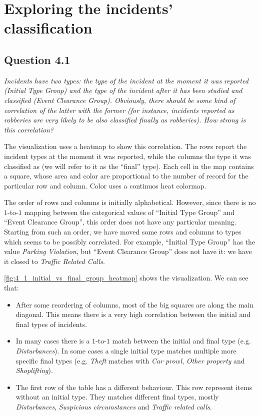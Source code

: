 \section{Exploring the incidents' classification}

\subsection*{Question 4.1}
\textit{Incidents have two types: the type of the incident at the moment it was reported (Initial Type Group) and the type of the incident after it has been studied and classified (Event Clearance Group). Obviously, there should be some kind of correlation of the latter with the former (for instance, incidents reported as robberies are very likely to be also classified finally as robberies). How strong is this correlation?}

The visualization uses a heatmap to show this correlation.
The rows report the incident types at the moment it was reported, while the columns the type it was classified as (we will refer to it as the ``final'' type).
Each cell in the map contains a square, whose area and color are proportional to the number of record for the particular row and column.
Color uses a continuos heat colormap.

The order of rows and columns is initially alphabetical.
However, since there is no $1$-to-$1$ mapping between the categorical values of ``Initial Type Group'' and ``Event Clearance Group'', this order does not have any particular meaning.
Starting from such an order, we have moved some rows and columns to types which seems to be possibly correlated.
For example, ``Initial Type Group'' has the value \textit{Parking Violation}, but ``Event Clearance Group'' does not have it:
we have it closed to \textit{Traffic Related Calls}.

\cref{fig:4_1_initial_vs_final_group_heatmap} shows the visualization.
We can see that:
\begin{itemize}
    \item After some reordering of columns, most of the big squares are along the main diagonal. This means there is a very high correlation between the initial and final types of incidents.
    \item In many cases there is a $1$-to-$1$ match between the initial and final type (e.g. \textit{Disturbances}). In some cases a single initial type matches multiple more specific final types (e.g. \textit{Theft} matches with \textit{Car prowl}, \textit{Other property} and \textit{Shoplifting}).
    \item The first row of the table has a different behaviour. This row represent items without an initial type. They matches different final types, mostly \textit{Disturbances}, \textit{Suspicious circumstances} and \textit{Traffic related calls}.
\end{itemize}

